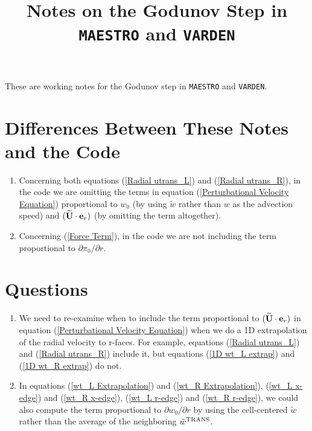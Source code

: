 \documentclass[11pt]{article}
\title{Notes on the Godunov Step in {\tt MAESTRO} and {\tt VARDEN}}
\def\trans {\rm TRANS}
\def\eb    {{\bf e}}
\def\Ubt   {\widetilde{\bf U}}
\def\wt    {\tilde{w}}
\begin{document}
\maketitle
\tableofcontents
\cleardoublepage

These are working notes for the Godunov step in {\tt MAESTRO} and {\tt VARDEN}.
\section{Differences Between These Notes and the Code}
\begin{enumerate}
\item Concerning both equations (\ref{Radial utrans_L}) and (\ref{Radial utrans_R}), in the code we are omitting the terms in equation (\ref{Perturbational Velocity Equation}) proportional to $w_0$ (by using $\wt$ rather than $w$ as the advection speed) and $(\Ubt\cdot\eb_r)$ (by omitting the term altogether).
\item Concerning (\ref{Force Term}), in the code we are not including the term proportional to $\partial\pi_0/\partial r$.
\end{enumerate}
\section{Questions}
\begin{enumerate}
\item We need to re-examine when to include the term proportional to $(\Ubt\cdot\eb_r)$ in equation (\ref{Perturbational Velocity Equation}) when we do a 1D extrapolation of the radial velocity to r-faces.  For example, equations (\ref{Radial utrans_L}) and (\ref{Radial utrans_R}) include it, but equations (\ref{1D wt_L extrap}) and (\ref{1D wt_R extrap}) do not.
\item In equations (\ref{wt_L Extrapolation}) and (\ref{wt_R Extrapolation}), (\ref{wt_L x-edge}) and (\ref{wt_R x-edge}), (\ref{wt_L r-edge}) and (\ref{wt_R r-edge}), we could also compute the term proportional to $\partial w_0/\partial r$ by using the cell-centered $\wt$ rather than the average of the neighboring $\wt^{\trans}$.
\end{enumerate}
\end{document}
